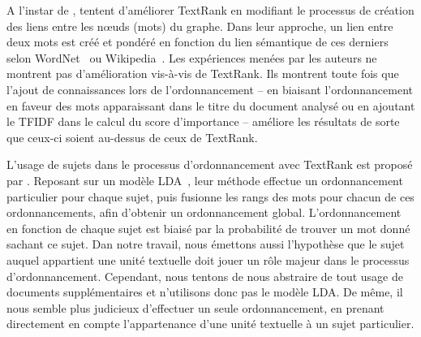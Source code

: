     A l'instar de ,
     tentent d'améliorer TextRank en
    modifiant le processus de création des liens entre les n\oe{}uds (mots) du
    graphe. Dans leur approche, un lien entre deux mots est créé et pondéré en
    fonction du lien sémantique de ces derniers selon
    WordNet~\cite{miller1995wordnet} ou
    Wikipedia~\cite{milne2008wikipediasemanticrelatedness}. Les expériences
    menées par les auteurs ne montrent pas d'amélioration vis-à-vis de TextRank.
    Ils montrent toute fois que l'ajout de connaissances lors de
    l'ordonnancement -- en biaisant l'ordonnancement en faveur des mots
    apparaissant dans le titre du document analysé ou en ajoutant le TFIDF dans
    le calcul du score d'importance -- améliore les résultats de sorte que
    ceux-ci soient au-dessus de ceux de TextRank.

    L'usage de sujets dans le processus d'ordonnancement avec TextRank est
    proposé par . Reposant sur un modèle
    LDA~\cite[Latent Dirichlet Allocation]{blei2003lda}, leur méthode effectue
    un ordonnancement particulier pour chaque sujet, puis fusionne les rangs des
    mots pour chacun de ces ordonnancements, afin d'obtenir un ordonnancement
    global. L'ordonnancement en fonction de chaque sujet est biaisé par la
    probabilité de trouver un mot donné sachant ce sujet. Dan notre travail,
    nous émettons aussi l'hypothèse que le sujet auquel appartient une unité
    textuelle doit jouer un rôle majeur dans le processus d'ordonnancement.
    Cependant, nous tentons de nous abstraire de tout usage de documents
    supplémentaires et n'utilisons donc pas le modèle LDA. De même, il nous
    semble plus judicieux d'effectuer un seule ordonnancement, en prenant
    directement en compte l'appartenance d'une unité textuelle à un sujet
    particulier.

